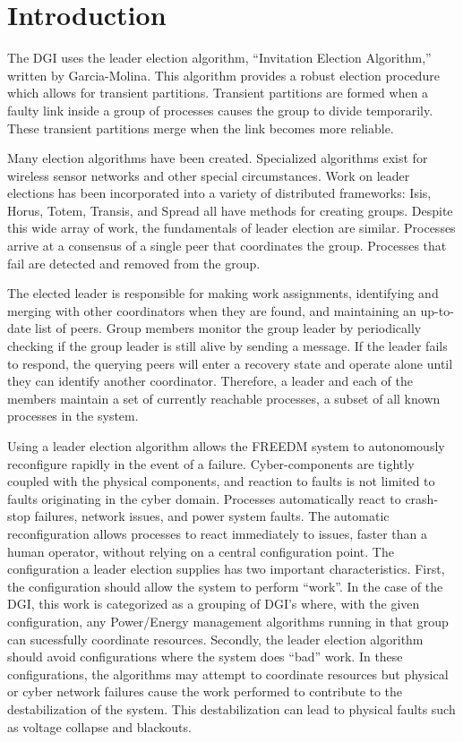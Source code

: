 \section{Introduction}

The DGI uses the leader election algorithm, ``Invitation Election Algorithm,'' written by Garcia-Molina\cite{INVITATIONELECTION}.
This algorithm provides a robust election procedure which allows for transient partitions.
Transient partitions are formed when a faulty link inside a group of processes causes the group to divide temporarily.
These transient partitions merge when the link becomes more reliable.

Many election algorithms have been created.
Specialized algorithms exist for wireless sensor networks\cite{LE-WSN-1}\cite{LE-WSN-2} and other special circumstances\cite{LE-SPECIALCIRCUMSTANCES-1}\cite{LE-SPECIALCIRCUMSTANCES-2}.
Work on leader elections has been incorporated into a variety of distributed frameworks: Isis\cite{ISISTOOLKIT}, Horus\cite{HORUSTOOLKIT}, Totem\cite{TOTEMTOOLKIT}, Transis\cite{TRANSISTOOLKIT}, and Spread\cite{SPREADTOOLKIT} all have methods for creating groups.
Despite this wide array of work, the fundamentals of leader election are similar.
Processes arrive at a consensus of a single peer that coordinates the group.
Processes that fail are detected and removed from the group.

The elected leader is responsible for making work assignments, identifying and merging with other coordinators when they are found, and maintaining an up-to-date list of peers.
Group members monitor the group leader by periodically checking if the group leader is still alive by sending a message.
If the leader fails to respond, the querying peers will enter a recovery state and operate alone until they can identify another coordinator.
Therefore, a leader and each of the members maintain a set of currently reachable processes, a subset of all known processes in the system.

Using a leader election algorithm allows the FREEDM system to autonomously reconfigure rapidly in the event of a failure.
Cyber-components are tightly coupled with the physical components, and reaction to faults is not limited to faults originating in the cyber domain.
Processes automatically react to crash-stop failures, network issues, and power system faults.
The automatic reconfiguration allows processes to react immediately to issues, faster than a human operator, without relying on a central configuration point.
The configuration a leader election supplies has two important characteristics.
First, the configuration should allow the system to perform ``work''.
In the case of the DGI, this work is categorized as a grouping of DGI's where, with the given configuration, any Power/Energy management algorithms running in that group can sucessfully coordinate resources.
Secondly, the leader election algorithm should avoid configurations where the system does ``bad'' work.
In these configurations, the algorithms may attempt to coordinate resources but physical or cyber network failures cause the work performed to contribute to the destabilization of the system.
This destabilization can lead to physical faults such as voltage collapse and blackouts\cite{HARINI}.

